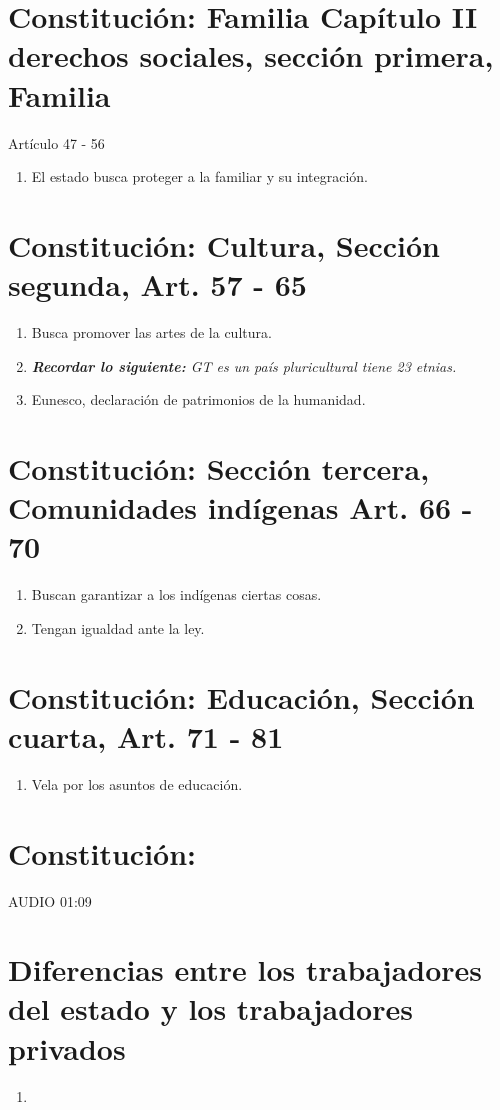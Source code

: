 \section{Constitución: Familia Capítulo II derechos sociales, sección primera, Familia}
Artículo 47 - 56
\begin{enumerate}
    \item El estado busca proteger a la familiar y su integración.
\end{enumerate}

\section{Constitución: Cultura, Sección segunda, Art. 57 - 65}
\begin{enumerate}
    \item Busca promover las artes de la cultura.
    \item \emph{\textbf{Recordar lo siguiente: }GT es un país pluricultural tiene 23 etnias.}
    \item Eunesco, declaración de patrimonios de la humanidad.
\end{enumerate}

\section{Constitución: Sección tercera, Comunidades indígenas Art. 66 - 70}
\begin{enumerate}
    \item Buscan garantizar a los indígenas ciertas cosas.
    \item Tengan igualdad ante la ley.
\end{enumerate}

\section{Constitución: Educación, Sección cuarta, Art. 71 - 81}
\begin{enumerate}
    \item Vela por los asuntos de educación.
\end{enumerate}

\section{Constitución: }


AUDIO 01:09

\section{Diferencias entre los trabajadores del estado y los trabajadores privados}
\begin{enumerate}
    \item 
\end{enumerate}
